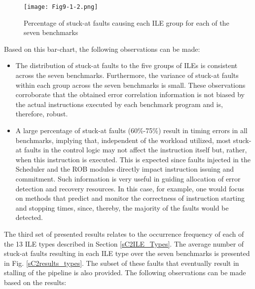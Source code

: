 \documentclass[12pt]{yalephd}
\newcommand{\snp}[1] {\noindent {\underline {#1}}}
\begin{document}
\begin{figure}[!ht]
\centering
\texttt{[image: Fig9-1-2.png]}
\caption{Percentage of stuck-at faults causing each ILE group for each of the seven benchmarks}
\label{sC2robustness}
\end{figure}

Based on this bar-chart, the following observations can be made:
\begin{itemize}
\item The distribution of stuck-at faults to the five groups of ILEs is consistent across the seven benchmarks. Furthermore, the variance of stuck-at faults within each group across the seven benchmarks is small. These observations corroborate that the obtained error correlation information is not biased by the actual instructions executed by each benchmark program and is, therefore, robust.
\item A large percentage of stuck-at faults (60\%-75\%) result in timing errors in all benchmarks, implying that, independent of the workload utilized, most stuck-at faults in the control logic may not affect the instruction itself but, rather, when this instruction is executed. This is expected since faults injected in the Scheduler and the ROB modules directly impact instruction issuing and commitment. Such information is very useful in guiding allocation of error detection and recovery resources. In this case, for example, one would focus on methods that predict and monitor the correctness of instruction starting and stopping times, since, thereby, the majority of the faults would be detected.
\end{itemize}

\snp{ILE Distribution:} The third set of presented results relates to the occurrence frequency of each of the 13 ILE types described in Section \ref{sC2ILE_Types}. The average number of stuck-at faults resulting in each ILE type over the seven benchmarks is presented in Fig. \ref{sC2results_types}. The subset of these faults that eventually result in stalling of the pipeline is also provided. The following observations can be made based on the results:
\end{document}
